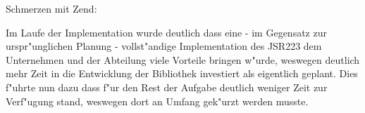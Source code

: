Schmerzen mit Zend:


Im Laufe der Implementation wurde deutlich dass eine - im Gegensatz zur urspr"unglichen Planung - vollst"andige
Implementation des JSR223 dem Unternehmen und der Abteilung viele Vorteile bringen w"urde, weswegen
deutlich mehr Zeit in die Entwicklung der Bibliothek investiert als eigentlich geplant. Dies f"uhrte nun
dazu dass f"ur den Rest der Aufgabe deutlich weniger Zeit zur Verf"ugung stand, weswegen dort an
Umfang gek"urzt werden musste.

